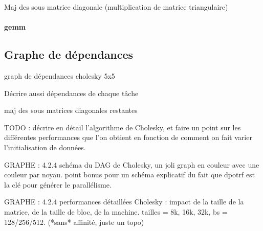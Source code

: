 Maj des sous matrice diagonale (multiplication de matrice triangulaire)

\paragraph{gemm}

\subsection{Graphe de dépendances}

\begin{todo}
graph de dépendances cholesky 5x5
\end{todo}

Décrire aussi dépendances de chaque tâche


maj des sous matrices diagonales restantes

TODO : décrire en détail l'algorithme de Cholesky, et faire un point sur les différentes performances que l'on obtient en fonction de comment on fait varier l'initialisation de données.

GRAPHE : 4.2.4 schéma du DAG de Cholesky, un joli graph en couleur avec une couleur par noyau. point bonus pour un schéma explicatif du fait que dpotrf est la clé pour générer le parallélisme.

GRAPHE : 4.2.4 performances détaillées Cholesky : impact de la taille de la matrice, de la taille de bloc, de la machine. tailles = 8k, 16k, 32k, bs = 128/256/512. (*sans* affinité, juste un topo)

